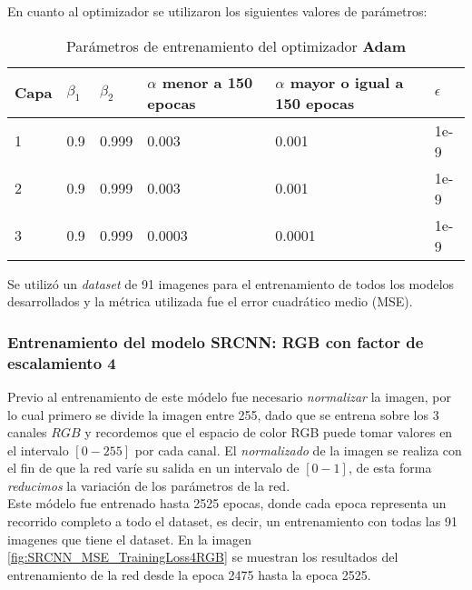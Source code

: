 En cuanto al optimizador se utilizaron los siguientes valores de parámetros:

\begin{table}[H]
    \centering
    \caption{Parámetros de entrenamiento del optimizador \textbf{Adam}}
    \begin{tabular}{|l|l|l|l|l|l|}
    \hline
    \textbf{Capa} & \textbf{$\beta_1$} & \textbf{$\beta_2$}  & \textbf{$\alpha$ menor a 150 epocas} & \textbf{$\alpha$ mayor o igual a 150 epocas} & \textbf{$\epsilon$}\\ \hline
    1             & 0.9           & 0.999          & 0.003                                        & 0.001                                        & 1e-9                 \\
    2             & 0.9           & 0.999          & 0.003                                        & 0.001                                        & 1e-9                 \\
    3             & 0.9           & 0.999          & 0.0003                                       & 0.0001                                       & 1e-9                 \\ \hline
    \end{tabular}
\end{table}

Se utilizó un \emph{dataset} de 91 imagenes para el entrenamiento de todos los modelos desarrollados y la métrica utilizada fue el
error cuadrático medio (MSE).

\subsubsection{Entrenamiento del modelo SRCNN: RGB con factor de escalamiento 4}
Previo al entrenamiento de este módelo fue necesario \emph{normalizar} la imagen, por lo cual primero se divide la imagen entre
255, dado que se entrena sobre los 3 canales $RGB$ y recordemos que el espacio de color RGB puede tomar valores en el intervalo
$[0-255]$ por cada canal. El \emph{normalizado} de la imagen se realiza con el fin de que la red varíe su salida en un intervalo
de $[0-1]$, de esta forma \emph{reducimos} la variación de los parámetros de la red.\\
Este módelo fue entrenado hasta 2525 epocas, donde cada epoca representa un recorrido completo a todo el dataset, es decir, un
entrenamiento con todas las 91 imagenes que tiene el dataset. En la imagen \ref{fig:SRCNN_MSE_TrainingLoss4RGB} se muestran
los resultados del entrenamiento de la red desde la epoca 2475 hasta la epoca 2525.

